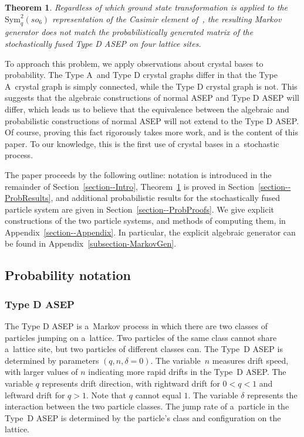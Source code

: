 \documentclass[10pt,a4paper]{amsart}
\numberwithin{equation}{section}
\newtheorem{Theorem}{Theorem}[section]
\theoremstyle{definition}
\def\mathfrak#1{#1}
\begin{document}
\begin{Theorem} \label{thm-bigalgebra}
 Regardless of which ground state transformation is applied to the $\mathrm{Sym}^2_q(\mathfrak{so}_6)$ representation of the Casimir element of~{\rm\cite{kuan2020interactingparticlesystemstype}}, the resulting Markov generator does not match the probabilistically generated matrix of the stochastically fused Type D ASEP on four lattice sites.
\end{Theorem}


To approach this problem, we apply observations about crystal bases to probability. The Type A~and Type D crystal graphs differ in that the Type A~crystal graph is simply connected, while the Type D crystal graph is not. This suggests that the algebraic constructions of normal ASEP and Type D ASEP will differ, which leads us to believe that the equivalence between the algebraic and probabilistic constructions of normal ASEP will not extend to the Type D ASEP. Of course, proving this fact rigorously takes more work, and is the content of this paper. To our knowledge, this is the first use of crystal bases in a~stochastic process.

The paper proceeds by the following outline: notation is introduced in the remainder of Section~\ref{section--Intro}, Theorem~\ref{thm-bigalgebra} is proved in Section~\ref{section--ProbResults}, and additional probabilistic results for the stochastically fused particle system are given in Section~\ref{section--ProbProofs}. We give explicit constructions of the two particle systems, and methods of computing them, in Appendix~\ref{section--Appendix}. In particular, the explicit algebraic generator can be found in Appendix~\ref{subsection-MarkovGen}.

\subsection{Probability notation} \label{subsection--ProbNotation}
\subsubsection{Type D ASEP}
\label{TypeDASEPIntro}
The Type D ASEP is a~Markov process in which there are two classes of particles jumping on a~lattice. Two particles of the same class cannot share a~lattice site, but two particles of different classes can. The Type~D ASEP is determined by parameters $(q,n,\delta = 0)$. The variable~$n$ measures drift speed, with larger values of $n$ indicating more rapid drifts in the Type~D ASEP. The variable $q$ represents drift direction, with rightward drift for $0<q<1$ and leftward drift for $q > 1$. Note that $q$ cannot equal $1$. The variable $\delta$ represents the interaction between the two particle classes. The jump rate of a~particle in the Type~D ASEP is determined by the particle's class and configuration on the lattice.
\end{document}
